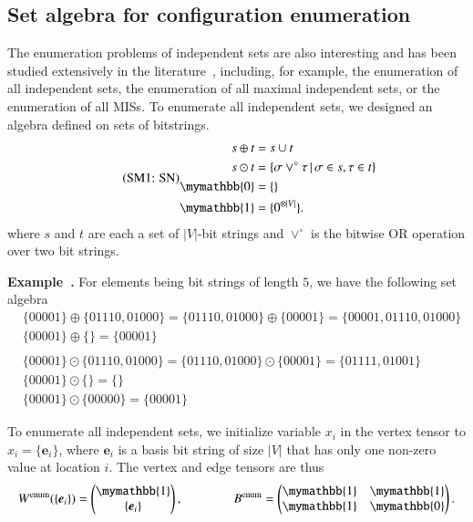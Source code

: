 \documentclass[onefignum, onetabnum]{siamart190516}
\newcommand{\eqname}[1]{\stepcounter{equation}\tag{\theequation : #1}}
\newcommand{\<}{\langle}
\renewcommand{\>}{\rangle}
\newcounter{example}
\newenvironment{example}[1][]{\refstepcounter{example}\par\medskip
   \noindent \textbf{Example~\theexample. #1} \rmfamily}{\medskip}
\begin{document}
\subsection{Set algebra for configuration enumeration}
The enumeration problems of independent sets are also interesting and has been studied extensively in the literature~\cite{Bron1973, Eppstein2010, Johnson1988}, including,
for example, the enumeration of all independent sets, the enumeration of all maximal independent sets, or the enumeration of all MISs.
To enumerate all independent sets, we designed an algebra defined on sets of bitstrings.
\begin{equation}
\eqname{SN}
\begin{split}
    s \oplus t &= s \cup t\\
    s \odot t &= \{\sigma \lor^\circ \tau \, | \, \sigma \in s, \tau \in t\}\\
    \mymathbb{0} &= \{\}\\
    \mymathbb{1} &= \{0^{\otimes |V|}\}.
\end{split}\label{eq:set}
\end{equation}
where $s$ and $t$ are each a set of $|V|$-bit strings and $\lor^\circ$ is the bitwise OR operation over two bit strings.
\begin{example}\label{eg:setalgebra}
    For elements being bit strings of length $5$, we have the following set algebra
\begin{equation*}
\begin{split}
    &\{00001\} \oplus \{01110, 01000\} = \{01110, 01000\} \oplus \{00001\} = \{00001,01110, 01000\}\\
    &\{00001\} \oplus \{\} = \{00001\}\\
&\\
    &\{00001\} \odot \{01110, 01000\} = \{01110, 01000\} \odot \{00001\} = \{01111, 01001\}\\
    &\{00001\} \odot \{\} = \{\}\\
    &\{00001\} \odot \{00000\} = \{00001\}
\end{split}
\end{equation*}
\end{example}

To enumerate all independent sets, 
we initialize variable $x_{i}$ in the vertex tensor to $x_i = \{\boldsymbol{e}_{i}\}$, where $\boldsymbol{e}_i$ is a basis bit string of size $|V|$ that has only one non-zero value at location $i$.
The vertex and edge tensors are thus
\begin{equation}
    W^{\rm enum}(\{\boldsymbol{e}_{i}\}) = \left(\begin{matrix}
        \mymathbb{1} \\
        \{\boldsymbol{e}_{i}\}
    \end{matrix}\right),   
    \qquad \qquad
        B^{\rm enum} = \left(\begin{matrix}
        \mymathbb{1}  & \mymathbb{1} \\
        \mymathbb{1} & \mymathbb{0}
    \end{matrix}\right).
\end{equation}
\end{document}
